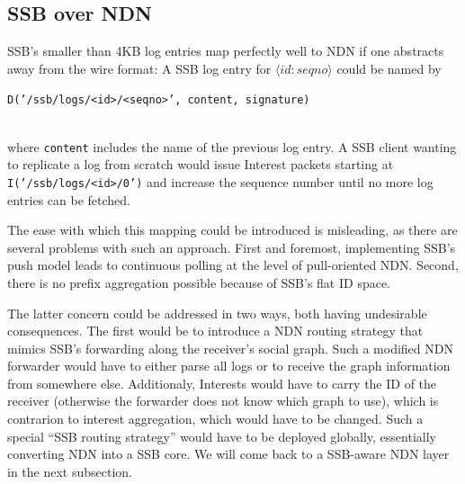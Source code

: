 \documentclass[10pt,sigconf,rewiew]{acmart}
\begin{document}
\subsection{SSB over NDN}
\label{ssect:ssb-over-ndn}

SSB's smaller than 4KB log entries map perfectly well to NDN if one
abstracts away from the wire format: A SSB
log entry for \mbox{$\langle id:seqno\rangle$} could be named by\\
  \centerline{\tt D('/ssb/logs/<id>/<seqno>', content, signature)} \\
where {\tt content} includes the name of the previous log entry.
%
%
A SSB client wanting to replicate a log from scratch would issue
Interest packets starting at {\tt I('/ssb/logs/<id>/0')} and increase the
sequence number until no more log entries can be fetched.

The ease with which this mapping could be introduced is misleading, as
there are several problems with such an approach. First and foremost,
implementing SSB's push model leads to continuous polling at the level
of pull-oriented NDN. Second, there is no prefix aggregation possible
because of SSB's flat ID space.

The latter concern could be addressed in two ways, both having
undesirable consequences. The first would be to introduce a NDN
routing strategy that mimics SSB's forwarding along the receiver's
social graph. Such a modified NDN forwarder would have to either parse
all logs or to receive the graph information from somewhere
else. Additionaly, Interests would have to carry the ID of the
receiver (otherwise the forwarder does not know which graph to use),
which is contrarion to interest aggregation, which would have to be
changed.  Such a special ``SSB routing strategy'' would have to be
deployed globally, essentially converting NDN into a SSB core. We will
come back to a SSB-aware NDN layer in the next subsection.
\end{document}
